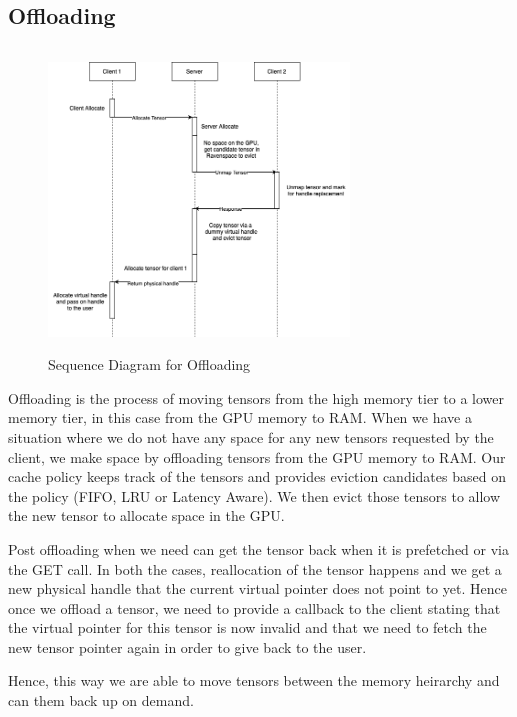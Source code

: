 \documentclass{article}
\begin{document}
\subsection{Offloading}
\begin{figure}[!htbp]
	\centering
	\includegraphics[height=8cm, width=8cm]{figures/Offloading.png}
	\caption{Sequence Diagram for Offloading}
\end{figure}
\FloatBarrier

Offloading is the process of moving tensors from the high memory tier to a lower memory tier, in this case from the GPU memory to RAM. When we have a situation where we do
not have any space for any new tensors requested by the client, we make space by offloading tensors from the
GPU memory to RAM. Our cache policy keeps track of the tensors and provides eviction candidates based on the policy (FIFO, LRU or Latency Aware). We then 
evict those tensors to allow the new tensor to allocate space in the GPU.

Post offloading when we need can get the tensor back when it is prefetched or via the GET call. In both the cases,
reallocation of the tensor happens and we get a new physical handle that the current virtual pointer does not point
to yet. Hence once we offload a tensor, we need to provide a callback to the client stating that the virtual pointer
for this tensor is now invalid and that we need to fetch the new tensor pointer again in order to give back to the user.

Hence, this way we are able to move tensors between the memory heirarchy and can them back up on demand.
\end{document}
